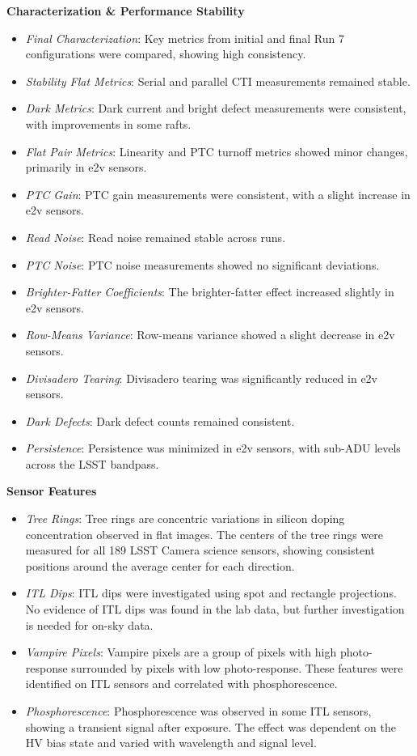 \textbf{Characterization \& Performance Stability} \\
\begin{itemize}
    \item \textit{Final Characterization}: Key metrics from initial and final Run 7 configurations were compared, showing high consistency.
    \item \textit{Stability Flat Metrics}: Serial and parallel CTI measurements remained stable.
    \item \textit{Dark Metrics}: Dark current and bright defect measurements were consistent, with improvements in some rafts.
    \item \textit{Flat Pair Metrics}: Linearity and PTC turnoff metrics showed minor changes, primarily in e2v sensors.
    \item \textit{PTC Gain}: PTC gain measurements were consistent, with a slight increase in e2v sensors.
    \item \textit{Read Noise}: Read noise remained stable across runs.
    \item \textit{PTC Noise}: PTC noise measurements showed no significant deviations.
    \item \textit{Brighter-Fatter Coefficients}: The brighter-fatter effect increased slightly in e2v sensors.
    \item \textit{Row-Means Variance}: Row-means variance showed a slight decrease in e2v sensors.
    \item \textit{Divisadero Tearing}: Divisadero tearing was significantly reduced in e2v sensors.
    \item \textit{Dark Defects}: Dark defect counts remained consistent.
    \item \textit{Persistence}: Persistence was minimized in e2v sensors, with sub-ADU levels across the LSST bandpass.
\end{itemize}

\textbf{Sensor Features} \\
\begin{itemize}
    \item \textit{Tree Rings}: Tree rings are concentric variations in silicon doping concentration observed in flat images. The centers of the tree rings were measured for all 189 LSST Camera science sensors, showing consistent positions around the average center for each direction.
    \item \textit{ITL Dips}: ITL dips were investigated using spot and rectangle projections. No evidence of ITL dips was found in the lab data, but further investigation is needed for on-sky data.
    \item \textit{Vampire Pixels}: Vampire pixels are a group of pixels with high photo-response surrounded by pixels with low photo-response. These features were identified on ITL sensors and correlated with phosphorescence.
    \item \textit{Phosphorescence}: Phosphorescence was observed in some ITL sensors, showing a transient signal after exposure. The effect was dependent on the HV bias state and varied with wavelength and signal level.
\end{itemize}

